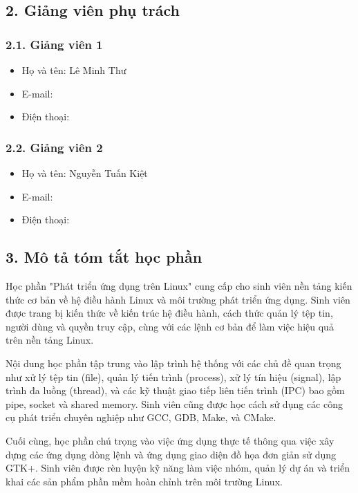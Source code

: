 \documentclass[a4paper,13pt]{article}
\begin{document}
\subsection*{2. Giảng viên phụ trách}
\subsubsection*{2.1. Giảng viên 1}
\begin{itemize}
    \item Họ và tên: Lê Minh Thư
    \item E-mail: 
    \item Điện thoại: 
\end{itemize}

\subsubsection*{2.2. Giảng viên 2}
\begin{itemize}
    \item Họ và tên: Nguyễn Tuấn Kiệt
    \item E-mail: 
    \item Điện thoại:
\end{itemize}

\subsection*{3. Mô tả tóm tắt học phần}
\hspace{1cm}Học phần "Phát triển ứng dụng trên Linux" cung cấp cho sinh viên nền tảng kiến thức cơ bản về hệ điều hành Linux và môi trường phát triển ứng dụng. Sinh viên được trang bị kiến thức về kiến trúc hệ điều hành, cách thức quản lý tệp tin, người dùng và quyền truy cập, cùng với các lệnh cơ bản để làm việc hiệu quả trên nền tảng Linux.

\hspace{1cm}Nội dung học phần tập trung vào lập trình hệ thống với các chủ đề quan trọng như xử lý tệp tin (file), quản lý tiến trình (process), xử lý tín hiệu (signal), lập trình đa luồng (thread), và các kỹ thuật giao tiếp liên tiến trình (IPC) bao gồm pipe, socket và shared memory. Sinh viên cũng được học cách sử dụng các công cụ phát triển chuyên nghiệp như GCC, GDB, Make, và CMake.

\hspace{1cm}Cuối cùng, học phần chú trọng vào việc ứng dụng thực tế thông qua việc xây dựng các ứng dụng dòng lệnh và ứng dụng giao diện đồ họa đơn giản sử dụng GTK+. Sinh viên được rèn luyện kỹ năng làm việc nhóm, quản lý dự án và triển khai các sản phẩm phần mềm hoàn chỉnh trên môi trường Linux.
\end{document}
